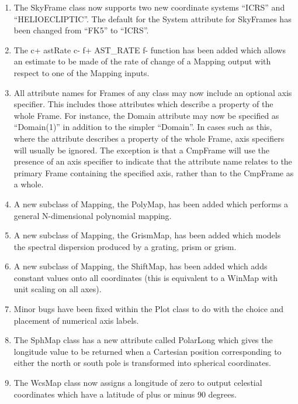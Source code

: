 \documentclass[twoside,11pt]{article}
\begin{document}
\begin{enumerate}
\item The SkyFrame class now supports two new coordinate systems ``ICRS''
and ``HELIOECLIPTIC''. The default for the System attribute for SkyFrames 
has been changed from ``FK5'' to ``ICRS''.

\item The 
c+
astRate
c-
f+
AST\_RATE
f-
function has been added which allows an estimate to be made of the rate of 
change of a Mapping output with respect to one of the Mapping inputs. 

\item All attribute names for Frames of any class may now include an optional
axis specifier. This includes those attributes which describe a property
of the whole Frame. For instance, the Domain attribute may now be
specified as ``Domain(1)'' in addition to the simpler ``Domain''. In cases
such as this, where the attribute describes a property of the whole
Frame, axis specifiers will usually be ignored. The exception is that a
CmpFrame will use the presence of an axis specifier to indicate that the
attribute name relates to the primary Frame containing the specified
axis, rather than to the CmpFrame as a whole.

\item A new subclass of Mapping, the PolyMap, has been added which
performs a general N-dimensional polynomial mapping.

\item A new subclass of Mapping, the GrismMap, has been added which
models the spectral dispersion produced by a grating, prism or grism.

\item A new subclass of Mapping, the ShiftMap, has been added which adds
constant values onto all coordinates (this is equivalent to a WinMap
with unit scaling on all axes).

\item Minor bugs have been fixed within the Plot class to do with the choice 
and placement of numerical axis labels.

\item The SphMap class has a new attribute called PolarLong which gives the 
longitude value to be returned when a Cartesian position corresponding to 
either the north or south pole is transformed into spherical coordinates.

\item The WcsMap class now assigns a longitude of zero to output
celestial coordinates which have a latitude of plus or minus 90 degrees.


\end{enumerate}
\end{document}
